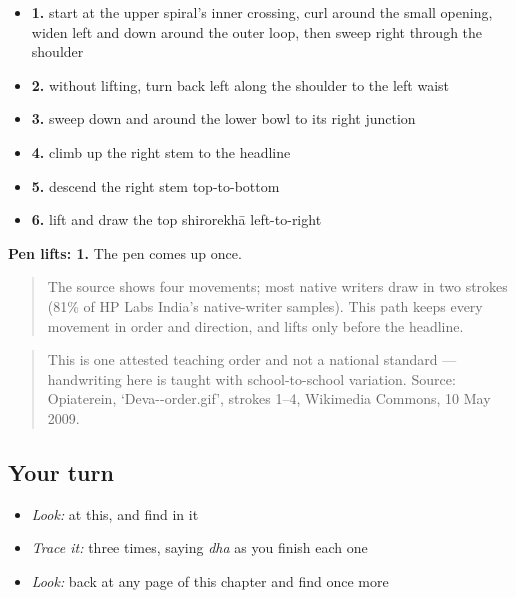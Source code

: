 \begin{itemize}
\raggedright
  \item \textbf{1.} start at the upper spiral's inner crossing, curl around the small opening, widen left and down around the outer loop, then sweep right through the shoulder
  \item \textbf{2.} without lifting, turn back left along the shoulder to the left waist
  \item \textbf{3.} sweep down and around the lower bowl to its right junction
  \item \textbf{4.} climb up the right stem to the headline
  \item \textbf{5.} descend the right stem top-to-bottom
  \item \textbf{6.} lift and draw the top shirorekhā left-to-right
\end{itemize}

\textbf{Pen lifts: 1.} The pen comes up once.

\begin{quote}
The source shows four movements; most native writers draw  in two strokes (81\% of HP Labs India's native-writer samples). This path keeps every movement in order and direction, and lifts only before the headline.
\end{quote}

\begin{quote}
This is one attested teaching order and not a national standard — handwriting here is taught with school-to-school variation. Source: Opiaterein, ‘Deva--order.gif’, strokes 1–4, Wikimedia Commons, 10 May 2009.
\end{quote}

\subsection*{Your turn}
\begin{itemize}
\raggedright
  \item \emph{Look:} at this, and find  in it
\end{itemize}

\begin{quote}
\end{quote}

\begin{itemize}
\raggedright
  \item \emph{Trace it:}  three times, saying \emph{dha} as you finish each one
  \item \emph{Look:} back at any page of this chapter and find  once more
\end{itemize}

